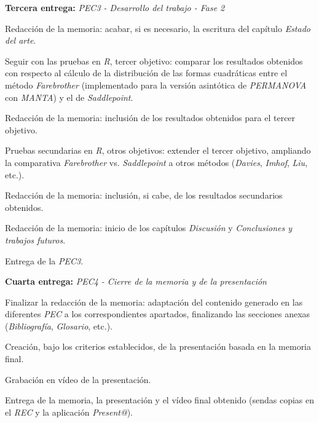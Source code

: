 \documentclass[IB,BIB]{TFUOC}%
\begin{document}
\begin{todolist}
  \item \textbf{Tercera entrega:} \textit{PEC3 - Desarrollo del trabajo - Fase 2}
  \begin{todolist}
  \item Redacción de la memoria: acabar, si es necesario, la escritura del capítulo \textit{Estado del arte}.
  \item Seguir con las pruebas en \textit{R}, tercer objetivo: comparar los resultados obtenidos con respecto al cálculo de la distribución de las formas cuadráticas entre el método \textit{Farebrother} (implementado para la versión asintótica de \textit{PERMANOVA} con \textit{MANTA}) y el de \textit{Saddlepoint}.
  \item Redacción de la memoria: inclusión de los resultados obtenidos para el tercer objetivo.
  \item Pruebas secundarias en \textit{R}, otros objetivos: extender el tercer objetivo, ampliando la comparativa \textit{Farebrother} vs. \textit{Saddlepoint} a otros métodos (\textit{Davies}, \textit{Imhof}, \textit{Liu}, etc.).
  \item Redacción de la memoria: inclusión, si cabe, de los resultados secundarios obtenidos.
  \item Redacción de la memoria: inicio de los capítulos \textit{Discusión} y \textit{Conclusiones y trabajos futuros}.
  \item Entrega de la \textit{PEC3}.
  \end{todolist}
\end{todolist}

\begin{todolist}
  \item \textbf{Cuarta entrega:} \textit{PEC4 - Cierre de la memoria y de la presentación}
  \begin{todolist}
  \item Finalizar la redacción de la memoria: adaptación del contenido generado en las diferentes \textit{PEC} a los correspondientes apartados, finalizando las secciones anexas (\textit{Bibliografía}, \textit{Glosario}, etc.).
  \item Creación, bajo los criterios establecidos, de la presentación basada en la memoria final.
  \item Grabación en vídeo de la presentación.
  \item Entrega de la memoria, la presentación y el vídeo final obtenido (sendas copias en el \textit{REC} y la aplicación \textit{Present@}).
  \end{todolist}
\end{todolist}
\end{document}

